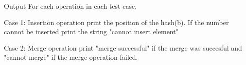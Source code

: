 Output
For each operation in each test case,  

   Case 1: Insertion operation print the position of the hash(b). If the number cannot be inserted print the string "cannot insert element"  

   Case 2: Merge operation print "merge successful" if the merge was succesful and "cannot merge" if the merge operation failed.